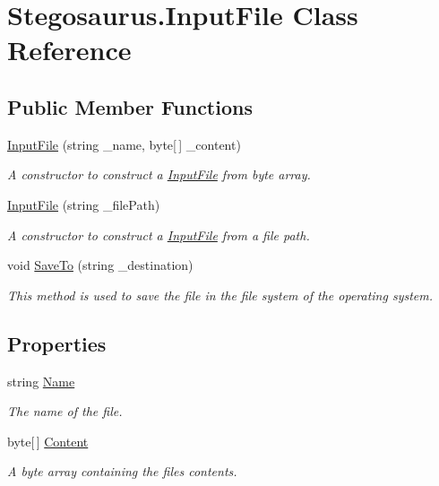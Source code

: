 \hypertarget{class_stegosaurus_1_1_input_file}{}\section{Stegosaurus.\+Input\+File Class Reference}
\label{class_stegosaurus_1_1_input_file}
\subsection*{Public Member Functions}
\begin{DoxyCompactItemize}
\item 
\hyperlink{class_stegosaurus_1_1_input_file_aa4a7db1edd50bbaf9a1375a0f1bf36f8}{Input\+File} (string \+\_\+name, byte\mbox{[}$\,$\mbox{]} \+\_\+content)
\begin{DoxyCompactList}\small\item\em A constructor to construct a \hyperlink{class_stegosaurus_1_1_input_file}{Input\+File} from byte array. \end{DoxyCompactList}\item 
\hyperlink{class_stegosaurus_1_1_input_file_ad06fe6aaf4a64d4e04abbef2492e06f3}{Input\+File} (string \+\_\+file\+Path)
\begin{DoxyCompactList}\small\item\em A constructor to construct a \hyperlink{class_stegosaurus_1_1_input_file}{Input\+File} from a file path. \end{DoxyCompactList}\item 
void \hyperlink{class_stegosaurus_1_1_input_file_a112c200323ceb421832cbbe882b512fb}{Save\+To} (string \+\_\+destination)
\begin{DoxyCompactList}\small\item\em This method is used to save the file in the file system of the operating system. \end{DoxyCompactList}\end{DoxyCompactItemize}
\subsection*{Properties}
\begin{DoxyCompactItemize}
\item 
string \hyperlink{class_stegosaurus_1_1_input_file_a02b6ebb5b60aa2f2b28a79a8ba386202}{Name}
\begin{DoxyCompactList}\small\item\em The name of the file. \end{DoxyCompactList}\item 
byte\mbox{[}$\,$\mbox{]} \hyperlink{class_stegosaurus_1_1_input_file_ad83ede306bf1084b6724f254cec7661e}{Content}
\begin{DoxyCompactList}\small\item\em A byte array containing the files contents. \end{DoxyCompactList}\end{DoxyCompactItemize}


